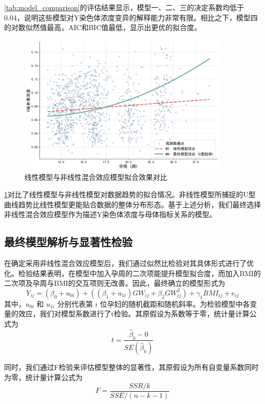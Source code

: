 \cref{tab:model_comparison}的评估结果显示，模型一、二、三的决定系数均低于0.04，说明这些模型对Y染色体浓度变异的解释能力非常有限。相比之下，模型四的对数似然值最高，AIC和BIC值最低，显示出更优的拟合度。

\begin{figure}[h!]
\centering
\includegraphics[width=0.9\textwidth]{figs/3问题一/模型拟合效果对比图.png}
\caption{线性模型与非线性混合效应模型拟合效果对比}
\label{fig:fit_comparison}
\end{figure}

\cref{fig:fit_comparison}对比了线性模型与非线性模型对数据趋势的拟合情况。非线性模型所捕捉的U型曲线趋势比线性模型更能贴合数据的整体分布形态。基于上述分析，我们最终选择非线性混合效应模型作为描述Y染色体浓度与母体指标关系的模型。

\subsection{最终模型解析与显著性检验}
在确定采用非线性混合效应模型后，我们通过似然比检验对其具体形式进行了优化。检验结果表明，在模型中加入孕周的二次项能提升模型拟合度，而加入BMI的二次项及孕周与BMI的交互项则无改善。因此，最终确立的模型形式为
\begin{equation}
Y_{ij} = (\beta_0 + u_{0i}) + ((\beta_1 + u_{1i})GW_{ij} + \beta_2 GW_{ij}^2) + \gamma_1 BMI_{ij} + e_{ij}
\end{equation}
其中，$u_{0i}$ 和 $u_{1i}$ 分别代表第 $i$ 位孕妇的随机截距和随机斜率。为检验模型中各变量的效应，我们对模型系数进行了t检验。其原假设为系数等于零，统计量计算公式为
\begin{equation}
t = \frac{\hat{\beta}_k - 0}{SE(\hat{\beta}_k)}
\end{equation}

同时，我们通过F检验来评估模型整体的显著性，其原假设为所有自变量系数同时为零，统计量计算公式为
\begin{equation}
F = \frac{SSR/k}{SSE/(n-k-1)}
\end{equation}

